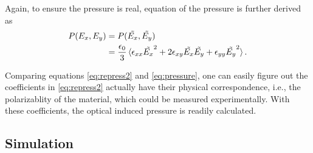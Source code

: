 \documentclass[twocolumn,showpacs,preprintnumbers,amsmath,amssymb]{revtex4}
\begin{document}

Again, to ensure the pressure is real, equation of the pressure is
further derived as
\begin{equation}
  \label{eq:pressure}
  \begin{split}
                                P(E_x,E_y) &= P(\tilde{E_x},\tilde{E_y})\\
                                &= \frac{\epsilon_0}{3}\braket{\epsilon_{xx}\tilde{E_x}^2 + 2
                                  \epsilon_{xy}\tilde{E_x}\tilde{E_y} +
                                  \epsilon_{yy}\tilde{E_y}^2} \mathrm{.}\\
  \end{split}
\end{equation}

Comparing equations \ref{eq:repress2} and \ref{eq:pressure}, one can
easily figure out the coefficients in \ref{eq:repress2} actually have
their physical correspondence, i.e., the polarizablity of the
material, which could be measured experimentally. With these
coefficients, the optical induced pressure is readily calculated.

\subsection{Simulation}
\end{document}
